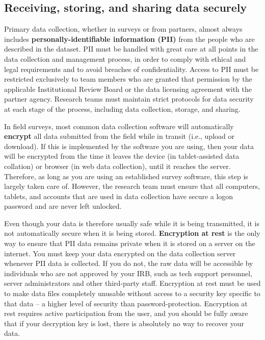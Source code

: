 \subsection{Receiving, storing, and sharing data securely}

Primary data collection, whether in surveys or from partners,
almost always includes \textbf{personally-identifiable information (PII)}
from the people who are described in the dataset.
PII must be handled with great care at all points in the data collection and management process,
in order to comply with ethical and legal requirements
and to avoid breaches of confidentiality.
Access to PII must be restricted exclusively to team members
who are granted that permission by the applicable Institutional Review Board
or the data licensing agreement with the partner agency.
Research teams must maintain strict protocols for data security at each stage of the process,
including data collection, storage, and sharing.

In field surveys, most common data collection software will automatically \textbf{encrypt}
all data submitted from the field while in transit (i.e., upload or download).
If this is implemented by the software you are using, then your
data will be encrypted from the time it leaves the device (in tablet-assisted data 
collation) or browser (in web data collection), until it reaches the server. 
Therefore, as long as you are using an established survey software, this step is 
largely taken care of. However, the research team must ensure that all computers, 
tablets, and accounts that are used in data collection have secure a logon 
password and are never left unlocked.

Even though your data is therefore usually safe while it is being transmitted,
it is not automatically secure when it is being stored.
\textbf{Encryption at rest}
is the only way to ensure that PII data remains private when it is stored on a
server on the internet. You must keep your data encrypted on the data collection server 
whenever PII data is collected. If you do not, the raw data will be accessible by 
individuals who are not approved by your IRB, such as tech support personnel, server 
administrators and other third-party staff. Encryption at rest must be used to make
data files completely unusable without access to a security key specific to that 
data -- a higher level of security than password-protection. Encryption at rest 
requires active participation from the user, and you should be fully aware that 
if your decryption key is lost, there is absolutely no way to recover your data.

